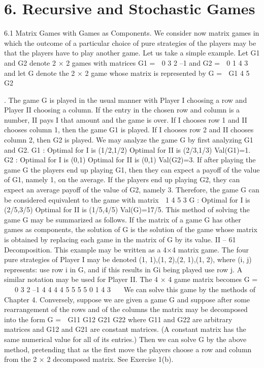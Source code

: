 \documentclass[]{report}
\begin{document}
\section{6. Recursive and Stochastic Games}
6.1 Matrix Games with Games as Components. We consider now matrix games
in which the outcome of a particular choice of pure strategies of the players may be that
the players have to play another game. Let us take a simple example.
Let G1 and G2 denote 2 × 2 games with matrices
G1 =
 0 3
2 –1
and G2 =
 0 1
4 3
and let G denote the 2 × 2 game whose matrix is represented by
G =
 G1 4
5 G2

.
The game G is played in the usual manner with Player I choosing a row and Player II
choosing a column. If the entry in the chosen row and column is a number, II pays I that
amount and the game is over. If I chooses row 1 and II chooses column 1, then the game
G1 is played. If I chooses row 2 and II chooses column 2, then G2 is played.
We may analyze the game G by first analyzing G1 and G2.
G1 : Optimal for I is (1/2,1/2)
Optimal for II is (2/3,1/3)
Val(G1)=1.
G2 : Optimal for I is (0,1)
Optimal for II is (0,1)
Val(G2)=3.
If after playing the game G the players end up playing G1, then they can expect a payoff
of the value of G1, namely 1, on the average. If the players end up playing G2, they can
expect an average payoff of the value of G2, namely 3. Therefore, the game G can be
considered equivalent to the game with matrix
 1 4
5 3
G :
Optimal for I is (2/5,3/5)
Optimal for II is (1/5,4/5)
Val(G)=17/5.
This method of solving the game G may be summarized as follows. If the matrix of
a game G has other games as components, the solution of G is the solution of the game
whose matrix is obtained by replacing each game in the matrix of G by its value.
II – 61
Decomposition. This example may be written as a 4×4 matrix game. The four pure
strategies of Player I may be denoted {(1, 1),(1, 2),(2, 1),(1, 2)}, where (i, j) represents:
use row i in G, and if this results in Gi being played use row j. A similar notation may
be used for Player II. The 4 × 4 game matrix becomes
G =
⎛
⎜⎝
0 3
2 –1
4 4
4 4
5 5
5 5
0 1
4 3
⎞
⎟⎠
We can solve this game by the methods of Chapter 4.
Conversely, suppose we are given a game G and suppose after some rearrangement of
the rows and of the columns the matrix may be decomposed into the form
G =
 G11 G12
G21 G22
where G11 and G22 are arbitrary matrices and G12 and G21 are constant matrices. (A
constant matrix has the same numerical value for all of its entries.) Then we can solve
G by the above method, pretending that as the first move the players choose a row and
column from the 2 × 2 decomposed matrix. See Exercise 1(b).
\end{document}
